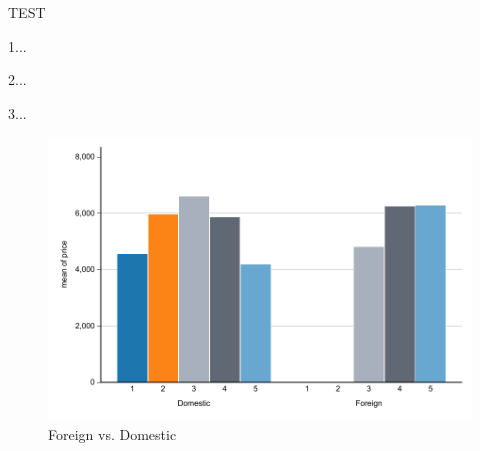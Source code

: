 \documentclass{beamer}
\begin{document}
    \begin{frame}
    TEST 

    1...

    2...

    3...
        \begin{figure}
            \centering
            \caption{Foreign vs. Domestic}
            \includegraphics[width=0.75\linewidth]{simple_figure/figure1.pdf}
        \end{figure}
    
    \end{frame}
\end{document}
